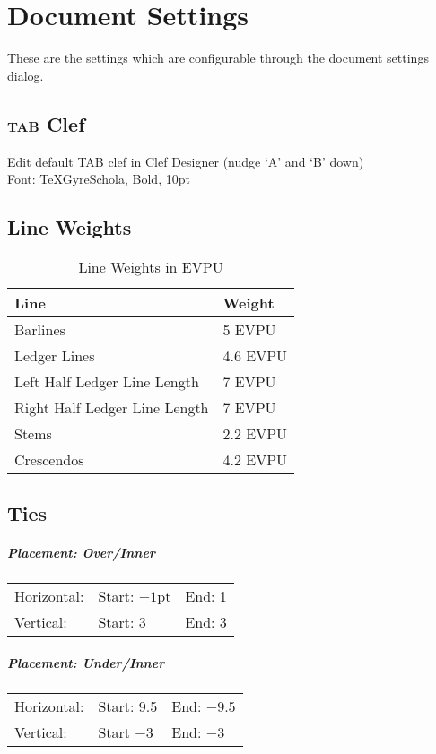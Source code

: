 \documentclass[]{memoir}
\begin{document}
\chapter{Document Settings}
These are the settings which are configurable through the
document settings dialog.
\section{\textsc{tab} Clef}
Edit default TAB clef in Clef Designer (nudge `A' and 	`B' down)\\
Font: TeXGyreSchola, Bold, 10pt
\section{Line Weights}
\begin{table}
  \begin{center}
\begin{tabular}[h!]{l l}
  Line & Weight\\\hline
  Barlines & 5 EVPU\\
  Ledger Lines & 4.6 EVPU\\
  Left Half Ledger Line Length & 7 EVPU\\
  Right Half Ledger Line Length & 7 EVPU\\
  Stems & 2.2 EVPU\\
  Crescendos & 4.2 EVPU\\
\end{tabular}
\end{center}
\caption{Line Weights in EVPU}
\end{table}
\section{Ties}
\paragraph{Placement: Over/Inner}
\begin{tabular}{l l l}
Horizontal: & Start: $-1$pt & End: 1\\
Vertical: & Start: 3 & End: 3\\
\end{tabular}
\paragraph{Placement: Under/Inner}
\begin{tabular}{l l l}
Horizontal: & Start: 9.5 & End: $-9.5$\\
Vertical: & Start $-3$ & End: $-3$
\end{tabular}
\end{document}
